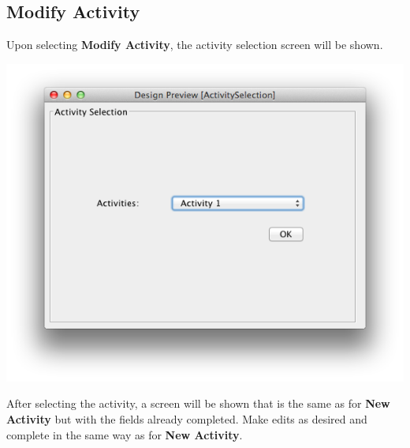 \documentclass{article}
\begin{document}
\subsection{Modify Activity}
Upon selecting \textbf{Modify Activity}, the activity selection screen will be shown.
  \begin{center} 
     \includegraphics[scale=0.55]{../images/UpdatedUIScreens/ActivitySelection.png}
     \label{actSel}
  \end{center} 
  After selecting the activity, a screen will be shown that is the same as for 
  \textbf{New Activity} but with the fields already completed. Make edits as
  desired and complete in the same way as for \textbf{New Activity}.
\clearpage
\end{document}
